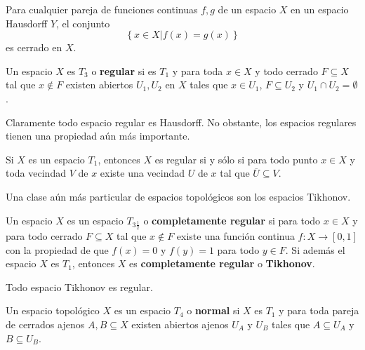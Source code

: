 \documentclass[12pt]{report}
\theoremstyle{largebreak}
\newcommand{\cf}[3]{\ensuremath{#1:#2\rightarrow#3}}
\begin{document}
    \begin{lema}
        Para cualquier pareja de funciones continuas $f,g$ de un espacio $X$ en un espacio Hausdorff $Y$, el conjunto
        \begin{equation*}
            \left\{x\in X\big|f(x)=g(x) \right\}
        \end{equation*}
        es cerrado en $X$.
    \end{lema}

    \begin{mydef}
        Un espacio $X$ es $T_3$ o \textbf{regular} si es $T_1$ y para toda $x\in X$ y todo cerrado $F\subseteq X$ tal que $x\notin F$ existen abiertos $U_1,U_2$ en $X$ tales que $x\in U_1$, $F\subseteq U_2$ y $U_1\cap U_2=\emptyset$.
    \end{mydef}

    Claramente todo espacio regular es Hausdorff. No obstante, los espacios regulares tienen una propiedad aún más importante.\

    \begin{propo}
        Si $X$ es un espacio $T_1$, entonces $X$ es regular si y sólo si para todo punto $x\in X$ y toda vecindad $V$ de $x$ existe una vecindad $U$ de $x$ tal que $\overline{U}\subseteq V$.
    \end{propo}

    Una clase aún más particular de espacios topológicos son los espacios Tikhonov.

    \begin{mydef}
        Un espacio $X$ es un espacio $T_{3\frac{1}{2}}$ o \textbf{completamente regular} si para todo $x\in X$ y para todo cerrado $F\subseteq X$ tal que $x\notin F$ existe una función continua $\cf{f}{X}{[0,1]}$ con la propiedad de que $f(x)=0$ y $f(y)=1$ para todo $y\in F$. Si además el espacio $X$ es $T_1$, entonces $X$ es \textbf{completamente regular} o \textbf{Tikhonov}.
    \end{mydef}

    \begin{theor}
        Todo espacio Tikhonov es regular.
    \end{theor}

    \begin{mydef}
        Un espacio topológico $X$ es un espacio $T_4$ o \textbf{normal} si $X$ es $T_1$ y para toda pareja de cerrados ajenos $A,B\subseteq X$ existen abiertos ajenos $U_A$ y $U_B$ tales que $A\subseteq U_A$ y $B\subseteq U_B$.
    \end{mydef}
\end{document}
